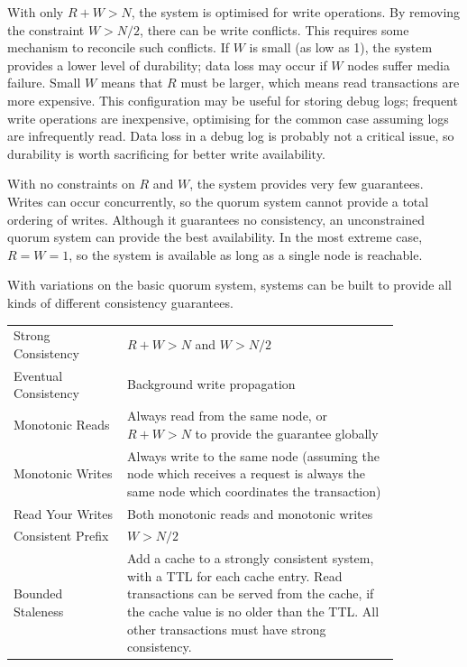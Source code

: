 \documentclass[12pt,a4paper,twoside,openany]{report}
\begin{document}
With only $R + W > N$, the system is optimised for write operations. By removing the constraint $W > N/2$, there can be write conflicts. This requires some mechanism to reconcile such conflicts. If $W$ is small (as low as 1), the system provides a lower level of durability; data loss may occur if $W$ nodes suffer media failure. Small $W$ means that $R$ must be larger, which means read transactions are more expensive. This configuration may be useful for storing debug logs; frequent write operations are inexpensive, optimising for the common case assuming logs are infrequently read. Data loss in a debug log is probably not a critical issue, so durability is worth sacrificing for better write availability.

With no constraints on $R$ and $W$, the system provides very few guarantees. Writes can occur concurrently, so the quorum system cannot provide a total ordering of writes. Although it guarantees no consistency, an unconstrained quorum system can provide the best availability. In the most extreme case, $R = W = 1$, so the system is available as long as a single node is reachable.

With variations on the basic quorum system, systems can be built to provide all kinds of different consistency guarantees.

\begin{table}[ht!]
\centering
\renewcommand{\arraystretch}{1.3}
\begin{tabular}{@{} m{0.25\linewidth} p{0.6\linewidth} @{}}
\toprule
Strong Consistency & $R + W > N$ and $W > N/2$\\
Eventual Consistency & Background write propagation\\
Monotonic Reads & Always read from the same node, or $R + W > N$ to provide the guarantee globally\\
Monotonic Writes & Always write to the same node (assuming the node which receives a request is always the same node which coordinates the transaction)\\
Read Your Writes & Both monotonic reads and monotonic writes\\
Consistent Prefix & $W > N/2$\\
Bounded Staleness & Add a cache to a strongly consistent system, with a TTL for each cache entry. Read transactions can be served from the cache, if the cache value is no older than the TTL. All other transactions must have strong consistency.\\
\bottomrule
\end{tabular}
\end{table}
\end{document}
